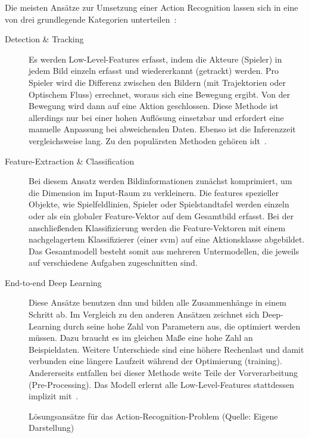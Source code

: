 Die meisten Ansätze zur Umsetzung einer Action Recognition lassen sich in eine von drei grundlegende Kategorien unterteilen~\cite{Rahmad18, Kothawade19}:

\begin{description}
    \item[Detection \& Tracking] Es werden Low-Level-Features erfasst, indem die Akteure (Spieler) in jedem Bild einzeln erfasst und wiedererkannt (getrackt) werden.
    Pro Spieler wird die Differenz zwischen den Bildern (\zB mit Trajektorien oder Optischem Fluss) errechnet, woraus sich eine Bewegung ergibt.
    Von der Bewegung wird dann auf eine Aktion geschlossen.
    Diese Methode ist allerdings nur bei einer hohen Auflösung einsetzbar und erfordert eine manuelle Anpassung bei abweichenden Daten.
    Ebenso ist die Inferenzzeit vergleichsweise lang.
    Zu den populärsten Methoden gehören \ua \gls{idt}~\cite{Wang13}.
    \item[Feature-Extraction \& Classification] Bei diesem Ansatz werden Bildinformationen zunächst komprimiert, um die Dimension im Input-Raum zu verkleinern.
    Die \gls{feature}s spezieller Objekte, wie Spielfeldlinien, Spieler oder Spielstandtafel werden einzeln oder als ein globaler Feature-Vektor auf dem Gesamtbild erfasst.
    Bei der anschließenden Klassifizierung werden die Feature-Vektoren mit einem nachgelagertem Klassifizierer (\zB einer \gls{svm}) auf eine Aktionsklasse abgebildet.
    Das Gesamtmodell besteht somit aus mehreren Untermodellen, die jeweils auf verschiedene Aufgaben zugeschnitten sind.
    \item[End-to-end Deep Learning] Diese Ansätze benutzen \gls{dnn} und bilden alle Zusammenhänge in einem Schritt ab.
    Im Vergleich zu den anderen Ansätzen zeichnet sich Deep-Learning durch seine hohe Zahl von Parametern aus, die optimiert werden müssen.
    Dazu braucht es im gleichen Maße eine hohe Zahl an Beispieldaten.
    Weitere Unterschiede sind eine höhere Rechenlast und damit verbunden eine längere Laufzeit während der Optimierung (\gls{training}).
    Andererseits entfallen bei dieser Methode weite Teile der Vorverarbeitung (Pre-Processing).
    Das Modell erlernt alle Low-Level-Features stattdessen implizit mit~\cite{Rahmad18}.
\end{description}

\begin{figure}[htbp!]
    \centering
    \caption{Lösungsansätze für das Action-Recognition-Problem (Quelle: Eigene Darstellung)}
    \label{fig:methods}
\end{figure}

